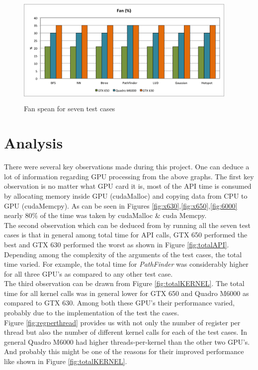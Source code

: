 \documentclass[paper=a4, fontsize=11pt]{scrartcl}
\numberwithin{equation}{section}		%
\numberwithin{figure}{section}			%
\numberwithin{table}{section}				%
\begin{document}
\begin{figure}[!h]
\centering
\includegraphics[width=0.95\textwidth,height=5.5cm]{../imgs/fan.png}
\caption{Fan spean for seven test cases}
\label{fig:fan}
\end{figure}
 


\newpage
\section{Analysis}

There were several key observations made during this project. One can deduce a lot of information regarding GPU processing from the above graphs. The first key observation is no matter what GPU card it is, most of the API time is consumed by allocating memory inside GPU (cudaMalloc) and copying data from CPU to GPU (cudaMemcpy). As can be seen in Figures \ref{fig:x630},\ref{fig:x650},\ref{fig:6000} nearly 80$\%$ of the time was taken by cudaMalloc \& cuda Memcpy. \\

The second observation which can be deduced from by running all the seven test cases is that in general among total time for API calls, GTX 650 performed the best and GTX 630 performed the worst as shown in Figure \ref{fig:totalAPI}. Depending among the complexity of the arguments of the test cases, the total time varied. For example, the total time for \textit{PathFinder} was considerably higher for all three GPU's as compared to any other test case.\\

The third observation can be drawn from Figure \ref{fig:totalKERNEL}. The total time for all kernel calls was in general lower for GTX 650 and Quadro M6000 as compared to GTX 630. Among both these GPU's their performance varied, probably due to the implementation of the test the cases. \\

Figure \ref{fig:regperthread} provides us with not only the number of register per thread but also the number of different kernel calls for each of the test cases. In general Quadro M6000 had higher threads-per-kernel than the other two GPU's. And probably this might be one of the reasons for their improved performance like shown in Figure \ref{fig:totalKERNEL}. \\
\end{document}
